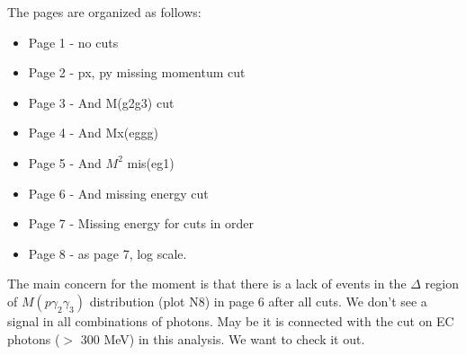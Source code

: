 \documentclass[11pt]{paper}
\begin{document}
The pages are organized as follows:
\begin{itemize}
\item {Page 1} - no cuts
\item Page 2 - px, py missing momentum cut
\item Page 3 - And M(g2g3) cut
\item Page 4 - And Mx(eggg) 
\item Page 5 - And $M^2$ mis(eg1)
\item Page 6 - And missing energy cut
\item Page 7 - Missing energy for  cuts in order
\item Page 8 - as page 7, log scale.
\end{itemize}

The main concern for the moment is that there is a lack of events in the  $\Delta$ region  
of $M(p\gamma_2\gamma_3)$ distribution (plot N8)
in page 6 after all cuts. We don't see a signal in all combinations of photons.
May be it is connected with the cut on EC photons ($>$ 300 MeV) in this analysis. 
We want to check it out.

 
\end{document}
